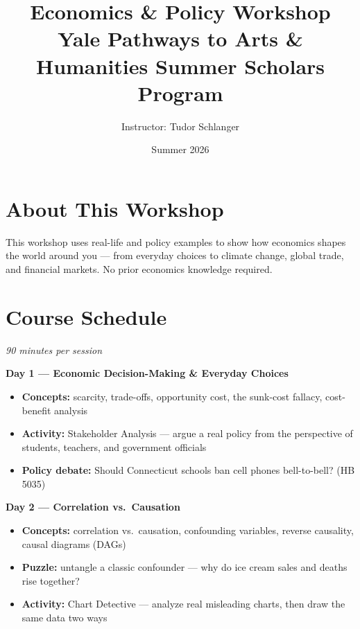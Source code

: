 \documentclass[letterpaper,10pt]{article}
\title{\textbf{Economics \& Policy Workshop}\\[0.3em]
       \large Yale Pathways to Arts \& Humanities Summer Scholars Program}
\author{Instructor: Tudor Schlanger}
\date{Summer 2026}
\begin{document}
\maketitle

\section*{About This Workshop}

This workshop uses real-life and policy examples to show how economics shapes the world around you --- from everyday choices to climate change, global trade, and financial markets. No prior economics knowledge required.

\section*{Course Schedule}

\textit{90 minutes per session}

\noindent\textbf{Day 1 --- Economic Decision-Making \& Everyday Choices}
\begin{itemize}
  \item \textbf{Concepts:} scarcity, trade-offs, opportunity cost, the sunk-cost fallacy, cost-benefit analysis
  \item \textbf{Activity:} Stakeholder Analysis --- argue a real policy from the perspective of students, teachers, and government officials
  \item \textbf{Policy debate:} Should Connecticut schools ban cell phones bell-to-bell? (HB 5035)
\end{itemize}

\vspace{0.6em}

\noindent\textbf{Day 2 --- Correlation vs.\ Causation}
\begin{itemize}
  \item \textbf{Concepts:} correlation vs.\ causation, confounding variables, reverse causality, causal diagrams (DAGs)
  \item \textbf{Puzzle:} untangle a classic confounder --- why do ice cream sales and deaths rise together?
  \item \textbf{Activity:} Chart Detective --- analyze real misleading charts, then draw the same data two ways
\end{itemize}
\end{document}
